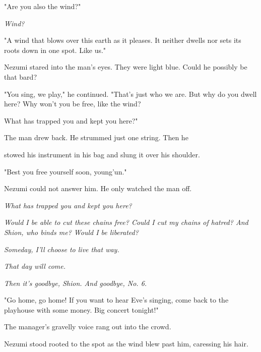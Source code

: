 "Are you also the wind?"

\emph{Wind?}

"A wind that blows over this earth as it pleases. It neither dwells nor
sets its roots down in one spot. Like us."

Nezumi stared into the man's eyes. They were light blue. Could he
possibly be that bard?

"You sing, we play," he continued. "That's just who we are. But why do
you dwell here? Why won't you be free, like the wind?~

What has trapped you and kept you here?"

The man drew back. He strummed just one string. Then he~

stowed his instrument in his bag and slung it over his shoulder.

"Best you free yourself soon, young'un."

Nezumi could not answer him. He only watched the man off.

\emph{What has trapped you and kept you here?}

\emph{Would I be able to cut these chains free? Could I cut my chains of
hatred? And Shion, who binds me? Would I be liberated?}

\emph{Someday, I'll choose to live that way.}

\emph{That day will come.}

\emph{Then it's goodbye, Shion. And goodbye, No. 6.}

"Go home, go home! If you want to hear Eve's singing, come back to the
playhouse with some money. Big concert tonight!"~

The manager's gravelly voice rang out into the crowd.

Nezumi stood rooted to the spot as the wind blew past him, caressing his
hair.